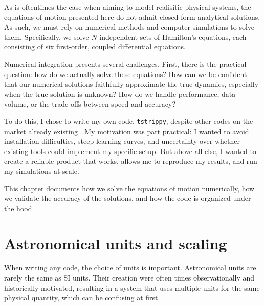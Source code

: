 As is oftentimes the case when aiming to model realisitic physical systems, the equations of motion presented here do not admit closed-form analytical solutions. As such, we must rely on numerical methods and computer simulations to solve them. Specifically, we solve $N$ independent sets of Hamilton's equations, each consisting of six first-order, coupled differential equations.

Numerical integration presents several challenges. First, there is the practical question: how do we actually solve these equations? How can we be confident that our numerical solutions faithfully approximate the true dynamics, especially when the true solution is unknown? How do we handle performance, data volume, or the trade-offs between speed and accuracy?

To do this, I chose to write my own code, \texttt{tstrippy}, despite other codes on the market already existing \citep{2013A&A...557A..84P,2015ApJS..216...29B,2015MNRAS.450.4070W,2017JOSS....2..388P,2018arXiv180208255V}. My motivation was part practical: I wanted to avoid installation difficulties, steep learning curves, and uncertainty over whether existing tools could implement my specific setup. But above all else, I wanted to create a reliable product that works, allows me to reproduce my results, and run my simulations at scale. 

This chapter documents how we solve the equations of motion numerically, how we validate the accuracy of the solutions, and how the code is organized under the hood.

\section{Astronomical units and scaling}
    When writing any code, the choice of units is important. Astronomical units are rarely the same as SI units. Their creation were often times observationally and historically motivated, resulting in a system that uses multiple units for the same physical quantity, which can be confusing at first.

